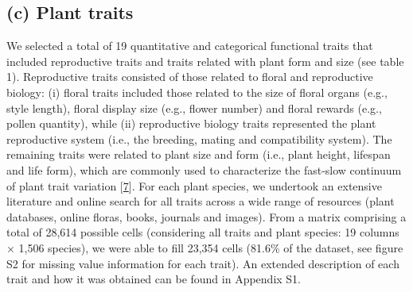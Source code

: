 \documentclass[
  12pt,
  a4paper,
]{article}
\begin{document}
\hypertarget{c-plant-traits}{%
\subsection{(c) Plant traits}\label{c-plant-traits}}

We selected a total of 19 quantitative and categorical functional traits that included reproductive traits and traits related with plant form and size (see table 1). Reproductive traits consisted of those related to floral and reproductive biology: (i) floral traits included those related to the size of floral organs (e.g., style length), floral display size (e.g., flower number) and floral rewards (e.g., pollen quantity), while (ii) reproductive biology traits represented the plant reproductive system (i.e., the breeding, mating and compatibility system). The remaining traits were related to plant size and form (i.e., plant height, lifespan and life form), which are commonly used to characterize the fast-slow continuum of plant trait variation {[}\protect\hyperlink{ref-salguero2016}{7}{]}. For each plant species, we undertook an extensive literature and online search for all traits across a wide range of resources (plant databases, online floras, books, journals and images). From a matrix comprising a total of 28,614 possible cells (considering all traits and plant species: 19 columns × 1,506 species), we were able to fill 23,354 cells (81.6\% of the dataset, see figure S2 for missing value information for each trait). An extended description of each trait and how it was obtained can be found in Appendix S1.

\singlespacing
\end{document}
